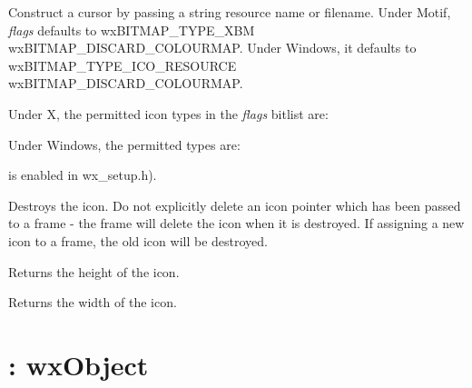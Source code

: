 Construct a cursor by passing a string resource name or filename.
Under Motif, {\it flags} defaults to wxBITMAP\_TYPE\_XBM \pipe wxBITMAP\_DISCARD\_COLOURMAP. Under Windows,
it defaults to wxBITMAP\_TYPE\_ICO\_RESOURCE \pipe wxBITMAP\_DISCARD\_COLOURMAP.

Under X, the permitted icon types in the {\it flags} bitlist are:

\begin{twocollist}\itemsep=0pt
\end{twocollist}

Under Windows, the permitted types are:

\begin{twocollist}\itemsep=0pt
is enabled in wx\_setup.h).
\end{twocollist}



Destroys the icon.  Do not explicitly delete an icon pointer which has
been passed to a frame - the frame will delete the icon when it is
destroyed. If assigning a new icon to a frame, the old icon will be
destroyed.



Returns the height of the icon.



Returns the width of the icon.

\section{: wxObject}\label{wxhashtable}

